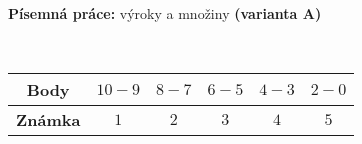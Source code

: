\begin{center}
\large \textbf{Písemná práce:} výroky a množiny \textbf{(varianta A)}

\normalsize
{}\qquad
{}\qquad
{}
\end{center}
\begin{table}[h]
\centering

\\
\begin{tabular}{c|c|c|c|c|c}
    \textbf{Body}   & $10-9$ & $8-7$ & $6-5$ & $4-3$ & $2-0$ \\ \hline
    \textbf{Známka} & $1$     & $2$   & $3 $  & $4$   & $5$
\end{tabular}
\end{table}



